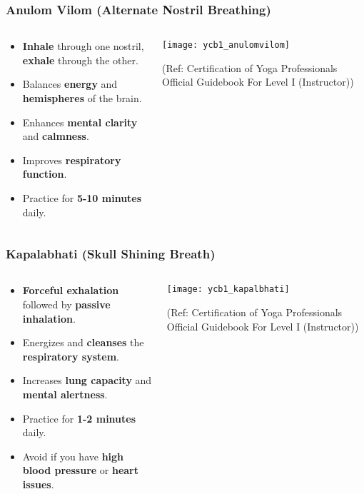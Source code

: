 \begin{frame}[fragile]\frametitle{Anulom Vilom (Alternate Nostril Breathing)}
\begin{columns}
    \begin{column}[T]{0.5\linewidth}
      \begin{itemize}
        \item \textbf{Inhale} through one nostril, \textbf{exhale} through the other.
        \item Balances \textbf{energy} and \textbf{hemispheres} of the brain.
        \item Enhances \textbf{mental clarity} and \textbf{calmness}.
        \item Improves \textbf{respiratory function}.
        \item Practice for \textbf{5-10 minutes} daily.
      \end{itemize}
    \end{column}
    \begin{column}[T]{0.5\linewidth}
        \begin{center}
        \texttt{[image: ycb1\_anulomvilom]}
				
		{\tiny (Ref: Certification  of Yoga Professionals Official Guidebook For Level I (Instructor))}	  
        \end{center}	
    \end{column}
\end{columns}
\end{frame}

\begin{frame}[fragile]\frametitle{Kapalabhati (Skull Shining Breath)}
\begin{columns}
    \begin{column}[T]{0.5\linewidth}
      \begin{itemize}
        \item \textbf{Forceful exhalation} followed by \textbf{passive inhalation}.
        \item Energizes and \textbf{cleanses} the \textbf{respiratory system}.
        \item Increases \textbf{lung capacity} and \textbf{mental alertness}.
        \item Practice for \textbf{1-2 minutes} daily.
        \item Avoid if you have \textbf{high blood pressure} or \textbf{heart issues}.
      \end{itemize}
    \end{column}
    \begin{column}[T]{0.5\linewidth}
        \begin{center}
        \texttt{[image: ycb1\_kapalbhati]}
				
		{\tiny (Ref: Certification  of Yoga Professionals Official Guidebook For Level I (Instructor))}	 
        \end{center}	
    \end{column}
\end{columns}
\end{frame}

